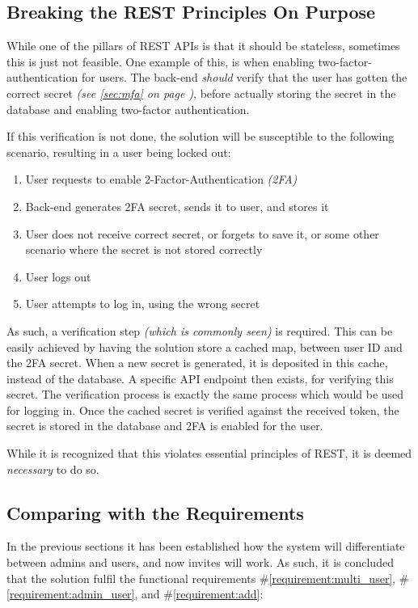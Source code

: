 		\subsection{Breaking the REST Principles On Purpose}
			\label{sec:design:breaking-rest}
			While one of the pillars of REST APIs is that it should be stateless, sometimes this is just not feasible. One example of this, is when enabling two-factor-authentication for users. The back-end \emph{should} verify that the user has gotten the correct secret \emph{(see \ref{sec:mfa} on page \pageref{sec:mfa})}, before actually storing the secret in the database and enabling two-factor authentication. 

			If this verification is not done, the solution will be susceptible to the following scenario, resulting in a user being locked out:
			\begin{enumerate}
				\item User requests to enable 2-Factor-Authentication \emph{(2FA)}
				\item Back-end generates 2FA secret, sends it to user, and stores it
				\item User does not receive correct secret, or forgets to save it, or some other scenario where the secret is not stored correctly
				\item User logs out
				\item User attempts to log in, using the wrong secret
			\end{enumerate}

			As such, a verification step \emph{(which is commonly seen)} is required. This can be easily achieved by having the solution store a cached map, between user ID and the 2FA secret. When a new secret is generated, it is deposited in this cache, instead of the database. A specific API endpoint then exists, for verifying this secret. The verification process is exactly the same process which would be used for logging in. Once the cached secret is verified against the received token, the secret is stored in the database and 2FA is enabled for the user.

			While it is recognized that this violates essential principles of REST, it is deemed \emph{necessary} to do so.


		\subsection{Comparing with the Requirements}
			\label{requirement:fulfilled:multi_user}
			\label{requirement:fulfilled:admin_user}
			\label{requirement:fulfilled:add}
			In the previous sections it has been established how the system will differentiate between admins and users, and now invites will work. As such, it is concluded that the solution fulfil the functional requirements \#\ref{requirement:multi_user}, \#\ref{requirement:admin_user}, and \#\ref{requirement:add}:

